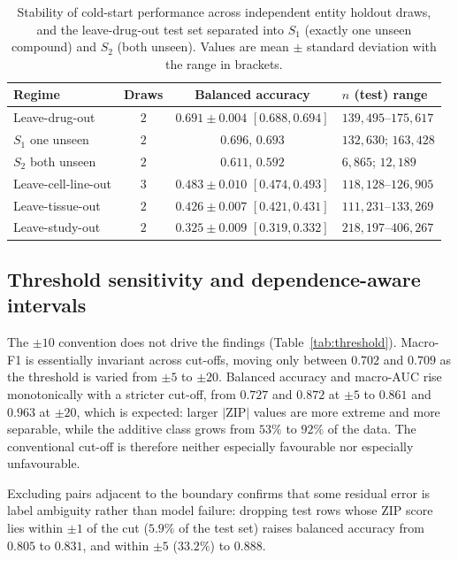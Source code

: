 \documentclass[11pt]{article}
\begin{document}
\begin{table}[H]
\centering
\caption{Stability of cold-start performance across independent entity holdout draws, and the
leave-drug-out test set separated into $S_1$ (exactly one unseen compound) and $S_2$ (both unseen).
Values are mean $\pm$ standard deviation with the range in brackets.}
\label{tab:multiseed}
\small
\begin{tabular}{lccl}
\toprule
Regime & Draws & Balanced accuracy & $n$ (test) range \\
\midrule
Leave-drug-out       & $2$ & $0.691 \pm 0.004$ $[0.688,0.694]$ & $139{,}495$--$175{,}617$ \\
\quad $S_1$ one unseen  & $2$ & $0.696$, $0.693$ & $132{,}630$; $163{,}428$ \\
\quad $S_2$ both unseen & $2$ & $0.611$, $0.592$ & $6{,}865$; $12{,}189$ \\
Leave-cell-line-out  & $3$ & $0.483 \pm 0.010$ $[0.474,0.493]$ & $118{,}128$--$126{,}905$ \\
Leave-tissue-out     & $2$ & $0.426 \pm 0.007$ $[0.421,0.431]$ & $111{,}231$--$133{,}269$ \\
Leave-study-out      & $2$ & $0.325 \pm 0.009$ $[0.319,0.332]$ & $218{,}197$--$406{,}267$ \\
\bottomrule
\end{tabular}
\end{table}

\subsection{Threshold sensitivity and dependence-aware intervals}
The $\pm 10$ convention does not drive the findings (Table~\ref{tab:threshold}). Macro-F1 is
essentially invariant across cut-offs, moving only between $0.702$ and $0.709$ as the threshold is
varied from $\pm 5$ to $\pm 20$. Balanced accuracy and macro-AUC rise monotonically with a stricter
cut-off, from $0.727$ and $0.872$ at $\pm 5$ to $0.861$ and $0.963$ at $\pm 20$, which is expected:
larger $|$ZIP$|$ values are more extreme and more separable, while the additive class grows from $53\%$
to $92\%$ of the data. The conventional cut-off is therefore neither especially favourable nor
especially unfavourable.

Excluding pairs adjacent to the boundary confirms that some residual error is label ambiguity rather
than model failure: dropping test rows whose ZIP score lies within $\pm 1$ of the cut ($5.9\%$ of the
test set) raises balanced accuracy from $0.805$ to $0.831$, and within $\pm 5$ ($33.2\%$) to $0.888$.
\end{document}
